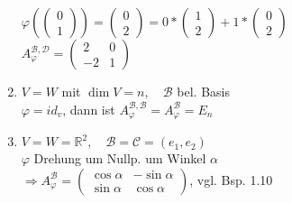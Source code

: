 \documentclass[a4paper,11pt]{article}
\begin{document}
\begin{enumerate}[label=\alph*)]
	$\varphi\left(\begin{pmatrix}0\\1\end{pmatrix}\right)=\begin{pmatrix}0\\2\end{pmatrix}=0*\begin{pmatrix}1\\2\end{pmatrix}+1*\begin{pmatrix}0\\2\end{pmatrix}$ \\
	$A^{\mathcal{B},\mathcal{D}}_\varphi=\begin{pmatrix}2 & 0 \\ -2 & 1\end{pmatrix}$
	\item $V=W$ mit $\dim V=n,\quad \mathcal{B}$ bel. Basis \\
	$\varphi=id_v$, dann ist $A^{\mathcal{B},\mathcal{B}}_\varphi=A^\mathcal{B}_\varphi=E_n$
	\item $V=W=\mathbb{R}^2,\quad\mathcal{B}=\mathcal{C}=(e_1,e_2)$ \\
	$\varphi$ Drehung um Nullp. um Winkel $\alpha$ \\
	$\Rightarrow A^\mathcal{B}_\varphi=\begin{pmatrix}\cos\alpha & -\sin\alpha \\ \sin\alpha & \cos\alpha\end{pmatrix}$, vgl. Bsp. 1.10
	
	\newpage
	

\end{enumerate}
\end{document}
